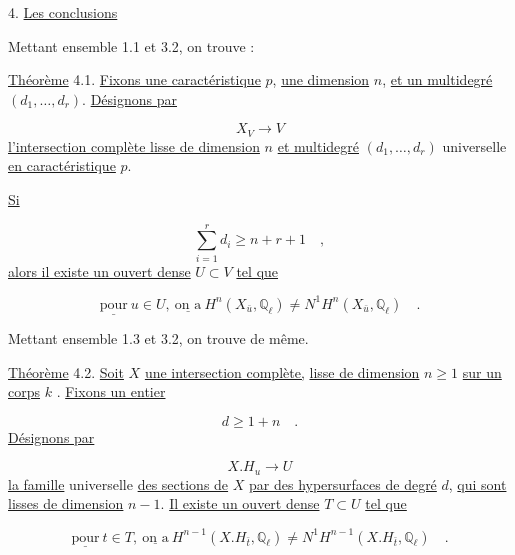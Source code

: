 4. \underline{Les conclusions}

Mettant ensemble 1.1 et 3.2, on trouve :

\underline{Théorème} 4.1. \underline{Fixons une caractéristique} $p$, \underline{une dimension} $n$, \underline{et un multidegré} $(d_1,\ldots,d_r)$. \underline{Désignons par}

\begin{equation}\tag{4.1.0}
X_V \longrightarrow V
\end{equation}
\underline{l'intersection complète lisse de dimension} $n$ \underline{et multidegré} $(d_1,\ldots,d_r)$ universelle \underline{en caractéristique} $p$.

\underline{Si}

\begin{equation}\tag{4.1.1}
\sum_{i=1}^{r} d_i \geqslant n + r + 1 \quad ,
\end{equation}
\underline{alors il existe un ouvert dense} $U \subset V$ \underline{tel que}

\begin{equation}\tag{4.1.2}
\underline{\text{pour}}\ u \in U, \ \underline{\text{on a}}\ H^n(X_{\bar{u}}, \mathbb{Q}_\ell) \neq N^1 H^n(X_{\bar{u}}, \mathbb{Q}_\ell) \quad .
\end{equation}


Mettant ensemble 1.3 et 3.2, on trouve de même.

\underline{Théorème} 4.2. \underline{Soit} $X$ \underline{une intersection complète,} \underline{lisse de dimension} $n \geqslant 1$ \underline{sur un corps} $k$ . \underline{Fixons un entier}

\begin{equation}\tag{4.2.1}
d \geqslant 1 + n \quad .
\end{equation}
\underline{Désignons par}

\begin{equation}\tag{4.2.2}
X.H_u \longrightarrow U
\end{equation}
\underline{la famille} universelle \underline{des sections de} $X$ \underline{par des hypersurfaces de degré} $d$, \underline{qui sont lisses de dimension} $n - 1$. \underline{Il existe un ouvert dense} $T \subset U$ \underline{tel que}

\begin{equation}\tag{4.2.3}
\underline{\text{pour}}\ t \in T, \ \underline{\text{on a}}\ H^{n-1}(X.H_{\bar{t}}, \mathbb{Q}_\ell) \neq N^1 H^{n-1}(X.H_{\bar{t}}, \mathbb{Q}_\ell) \quad .
\end{equation}

